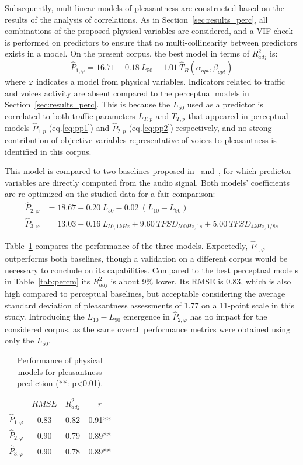 \documentclass[11pt,a4paper]{article}
\begin{document}
Subsequently, multilinear models of pleasantness are constructed based on the results of the analysis of correlations. As in Section~\ref{sec:results_perc}, all combinations of the proposed physical variables are considered, and a VIF check is performed on predictors to ensure that no multi-collinearity between predictors exists in a model. On the present corpus, the best model in terms of $R^2_{adj}$ is:
\begin{equation}
\hat P_{1, \varphi} = 16.71 - 0.18~L_{50} + 1.01~\hat T_B(\alpha_{opt}, \beta_{opt}) \label{eq:pphi}
\end{equation}
where $\varphi$ indicates a model from physical variables. Indicators related to traffic and voices activity are absent compared to the perceptual models in Section~\ref{sec:results_perc}. This is because the $L_{50}$ used as a predictor is correlated to both traffic parameters $L_{T, p}$ and $T_{T, p}$ that appeared in perceptual models $\hat P_{1, p}$ (eq.\ref{eq:pp1}) and $\hat P_{2, p}$ (eq.\ref{eq:pp2}) respectively, and no strong contribution of objective variables representative of voices to pleasantness is identified in this corpus.

This model is compared to two baselines proposed in~\cite{ricciardi2014} and~\cite{aumond2017}, for which predictor variables are directly computed from the audio signal. Both models' coefficients are re-optimized on the studied data for a fair comparison:
\begin{align}
\hat P_{2, \varphi} &= 18.67 - 0.20~L_{50} - 0.02~(L_{10}-L_{90})\\
\hat P_{3, \varphi} &= 13.03 - 0.16~L_{50, 1kHz} + 9.60~TFSD_{500Hz, 1s} + 5.00~TFSD_{4kHz, 1/8s}
\end{align}

Table~\ref{tab:physm} compares the performance of the three models. Expectedly, $\hat P_{1, \varphi}$ outperforms both baselines, though a validation on a different corpus would be necessary to conclude on its capabilities. Compared to the best perceptual models in Table~\ref{tab:percm} its $R^2_{adj}$ is about 9\% lower. Its RMSE is 0.83, which is also high compared to perceptual baselines, but acceptable considering the average standard deviation of pleasantness assessments of 1.77 on a 11-point scale in this study. Introducing the $L_{10}-L_{90}$ emergence in $\hat P_{2, \varphi}$ has no impact for the considered corpus, as the same overall performance metrics were obtained using only the $L_{50}$.

\begin{table}[t]
\centering
\caption{Performance of physical models for pleasantness prediction (**: p<0.01).}
\label{tab:physm}
\begin{tabular}{ c | c | c | c }
\hline
	 & $RMSE$ & $R^2_{adj}$ & $r$ \\ \hline
	$\hat P_{1, \varphi}$ & 0.83 & 0.82 & 0.91** \\
	$\hat P_{2, \varphi}$ & 0.90 & 0.79 & 0.89** \\
	$\hat P_{3, \varphi}$ & 0.90 & 0.78 & 0.89** \\ \hline
\end{tabular}
\end{table}
\end{document}
